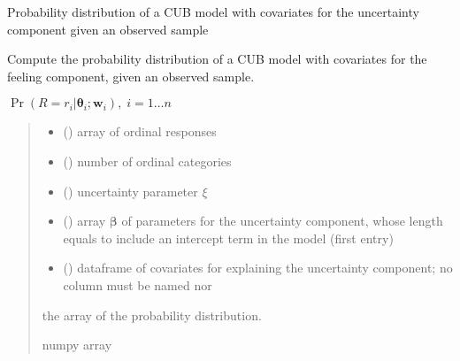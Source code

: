 \documentclass[letterpaper,10pt,english]{sphinxmanual}
\begin{document}

\begin{fulllineitems}
\label{\detokenize{cubmods:cubmods.cub_y0.prob}}
\pysigstartsignatures
{}
\pysigstopsignatures
\sphinxAtStartPar
Probability distribution of a CUB model with covariates for the uncertainty component
given an observed sample

\sphinxAtStartPar
Compute the probability distribution of a CUB model with covariates
for the feeling component, given an observed sample.

\sphinxAtStartPar
\(\Pr(R = r_i | \pmb\theta_i ; \pmb w_i),\; i=1 \ldots n\)
\begin{quote}\begin{description}
\begin{itemize}
\item {} 
\sphinxAtStartPar
{} () \textendash{} array of ordinal responses

\item {} 
\sphinxAtStartPar
{} () \textendash{} number of ordinal categories

\item {} 
\sphinxAtStartPar
{} () \textendash{} uncertainty parameter \(\xi\)

\item {} 
\sphinxAtStartPar
{} () \textendash{} array \(\pmb \beta\) of parameters for the uncertainty component, whose length equals 
 to include an intercept term in the model (first entry)

\item {} 
\sphinxAtStartPar
{} () \textendash{} dataframe of covariates for explaining the uncertainty component;
no column must be named  nor 

\end{itemize}

\sphinxAtStartPar
the array of the probability distribution.

\sphinxAtStartPar
numpy array

\end{description}\end{quote}

\end{fulllineitems}
\end{document}

